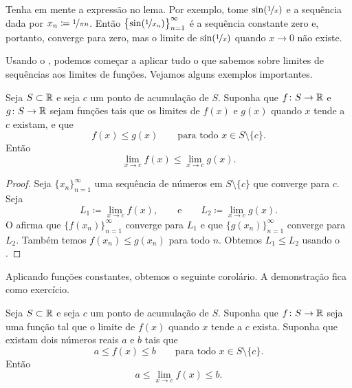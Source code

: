 Tenha em mente a expressão  no lema.
Por exemplo, tome $\sin(\nicefrac{1}{x})$ e a sequência dada por
$x_n \coloneqq \nicefrac{1}{\pi n}$.
Então $\bigl\{ \sin (\nicefrac{1}{x_n}) \bigr\}_{n=1}^\infty$
é a sequência constante zero e, portanto, converge para zero, mas o limite de
$\sin(\nicefrac{1}{x})$ quando $x \to 0$ não existe.

Usando o ,
podemos começar a aplicar tudo o que sabemos sobre
limites de sequências aos limites de funções. Vejamos alguns exemplos importantes.

\begin{cor}
Seja $S \subset {\mathbb{R}}$ e seja $c$ um ponto de acumulação de $S$.
Suponha que $f \colon S \to
{\mathbb{R}}$ e $g \colon S \to {\mathbb{R}}$ sejam funções tais que
os limites de $f(x)$ e $g(x)$ quando $x$ tende a $c$ existam, e que
\begin{equation*}
f(x) \leq g(x) \qquad \text{para todo } x \in S \setminus \{ c \}.
\end{equation*}
Então
\begin{equation*}
\lim_{x\to c} f(x) \leq \lim_{x\to c} g(x) .
\end{equation*}
\end{cor}

\begin{proof}
Seja $\{ x_n \}_{n=1}^\infty$ uma sequência de números em $S \setminus \{ c \}$
que converge para $c$. Seja
\begin{equation*}
L_1 \coloneqq \lim_{x\to c} f(x), \qquad \text{e} \qquad L_2 \coloneqq \lim_{x\to c} g(x) .
\end{equation*}
O  afirma que $\bigl\{ f(x_n) \bigr\}_{n=1}^\infty$ converge para
$L_1$ e que $\bigl\{ g(x_n) \bigr\}_{n=1}^\infty$ converge para $L_2$. Também
temos $f(x_n) \leq g(x_n)$ para todo $n$.
Obtemos $L_1 \leq L_2$ usando o
.
\end{proof}

Aplicando funções constantes, obtemos o seguinte corolário. A demonstração
fica como exercício.

\begin{cor} \label{fconstineq:cor}
Seja $S \subset {\mathbb{R}}$ e seja $c$ um ponto de acumulação de $S$. Suponha que $f \colon S \to
{\mathbb{R}}$ seja uma função tal que o limite de $f(x)$ quando $x$ tende a $c$
exista.
Suponha que existam dois números reais $a$ e $b$ tais que
\begin{equation*}
a \leq f(x) \leq b \qquad \text{para todo } x \in S \setminus \{ c \}.
\end{equation*}
Então
\begin{equation*}
a \leq \lim_{x\to c} f(x) \leq b .
\end{equation*}
\end{cor}

